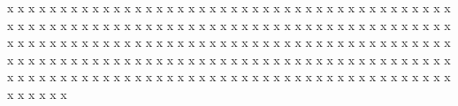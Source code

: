 \documentclass[a4paper]{article}
\begin{document}
\linenumbers

\lipsum[1]

x x x x x x x x x x x x x x x x x x x x x x x x x x x x x x x x x x x x x x x x x x x x x x x x x x x x x x
x x x x x x x x x x x x x x x x x x x x x x x x x x x x x x x x x x x x x x x x x x x x x x x x x x x x x x
x x x x x x x x x x x x x x x x x x x x x x x x x x x x x x x x x x x x x x x x x x x x x x x x x x x x x x
x x x x x x x x x x x x x x x x x x x x x x x x x x x x x x x x x x x x x x x x x x x x x x x x x x x x x x


\end{document}
